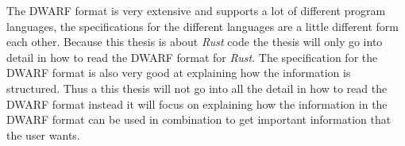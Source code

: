 The \gls{DWARF} format is very extensive and supports a lot of different program languages, the specifications for the different languages are a little different form each other.
Because this thesis is about \emph{Rust} code the thesis will only go into detail in how to read the \gls{DWARF} format for \emph{Rust}.
The specification for the \gls{DWARF} format is also very good at explaining how the information is structured.
Thus a this thesis will not go into all the detail in how to read the \gls{DWARF} format instead it will focus on explaining how the information in the \gls{DWARF} format can be used in combination to get important information that the user wants.



